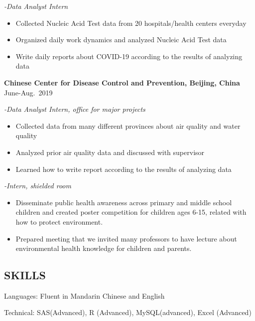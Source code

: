 \documentclass[
  a4paper,
]{article}
\providecommand{\tightlist}{%
  \setlength{\itemsep}{0pt}\setlength{\parskip}{0pt}}
\begin{document}
\emph{\emph{-Data Analyst Intern}}

\begin{itemize}
\tightlist
\item
  Collected Nucleic Acid Test data from 20 hospitals/health centers
  everyday
\item
  Organized daily work dynamics and analyzed Nucleic Acid Test data
\item
  Write daily reports about COVID-19 according to the results of
  analyzing data
\end{itemize}

\textbf{Chinese Center for Disease Control and Prevention, Beijing,
China} \hfill  June-Aug.~2019

\emph{\emph{-Data Analyst Intern, office for major projects}}

\begin{itemize}
\tightlist
\item
  Collected data from many different provinces about air quality and
  water quality
\item
  Analyzed prior air quality data and discussed with supervisor
\item
  Learned how to write report according to the results of analyzing data
\end{itemize}

\emph{\emph{-Intern, shielded room}}

\begin{itemize}
\tightlist
\item
  Disseminate public health awareness across primary and middle school
  children and created poster competition for children ages 6-15,
  related with how to protect environment.
\item
  Prepared meeting that we invited many professors to have lecture about
  environmental health knowledge for children and parents.
\end{itemize}

\hfill\break

\subsection{SKILLS}\label{skills}

Languages: Fluent in Mandarin Chinese and English

Technical: SAS(Advanced), R (Advanced), MySQL(advanced), Excel
(Advanced)
\end{document}
